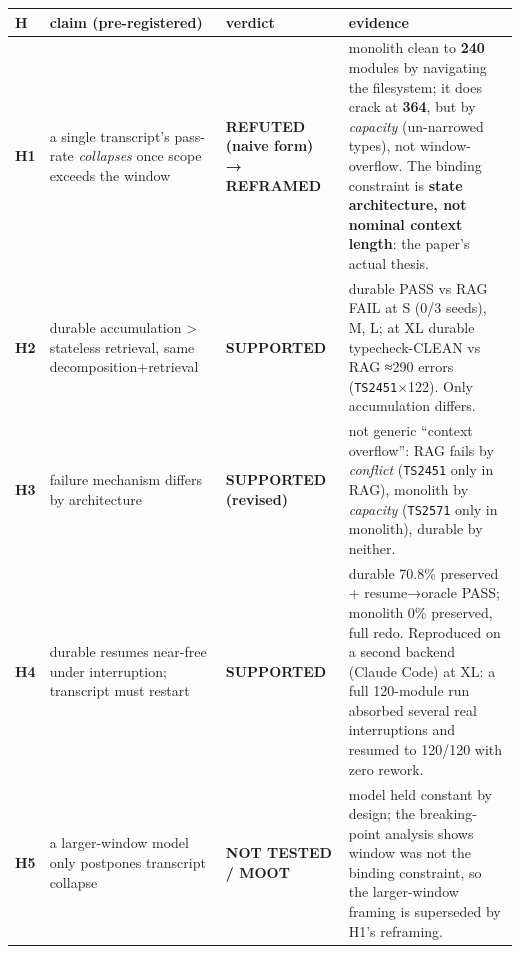 \documentclass[
  10pt,
]{article}
\newcounter{none} %
\begin{document}
{\def\LTcaptype{none} %
\begin{longtable}[]{@{}
  >{\raggedright\arraybackslash}p{}
  >{\raggedright\arraybackslash}p{}
  >{\raggedright\arraybackslash}p{}
  >{\raggedright\arraybackslash}p{}@{}}
\toprule\noalign{}
\begin{minipage}[b]{\linewidth}\raggedright
H
\end{minipage} & \begin{minipage}[b]{\linewidth}\raggedright
claim (pre-registered)
\end{minipage} & \begin{minipage}[b]{\linewidth}\raggedright
verdict
\end{minipage} & \begin{minipage}[b]{\linewidth}\raggedright
evidence
\end{minipage} \\
\midrule\noalign{}
\endhead
\bottomrule\noalign{}
\endlastfoot
\textbf{H1} & a single transcript's pass-rate \emph{collapses} once
scope exceeds the window & \textbf{REFUTED (naive form) → REFRAMED} &
monolith clean to \textbf{240} modules by navigating the filesystem; it
does crack at \textbf{364}, but by \emph{capacity} (un-narrowed types),
not window-overflow. The binding constraint is \textbf{state
architecture, not nominal context length}: the paper's actual thesis. \\
\textbf{H2} & durable accumulation \textgreater{} stateless retrieval,
same decomposition+retrieval & \textbf{SUPPORTED} & durable PASS vs RAG
FAIL at S (0/3 seeds), M, L; at XL durable typecheck-CLEAN vs RAG ≈290
errors (\texttt{TS2451}×122). Only accumulation differs. \\
\textbf{H3} & failure mechanism differs by architecture &
\textbf{SUPPORTED (revised)} & not generic ``context overflow'': RAG
fails by \emph{conflict} (\texttt{TS2451} only in RAG), monolith by
\emph{capacity} (\texttt{TS2571} only in monolith), durable by
neither. \\
\textbf{H4} & durable resumes near-free under interruption; transcript
must restart & \textbf{SUPPORTED} & durable 70.8\% preserved +
resume→oracle PASS; monolith 0\% preserved, full redo. Reproduced on a
second backend (Claude Code) at XL: a full 120-module run absorbed
several real interruptions and resumed to 120/120 with zero rework. \\
\textbf{H5} & a larger-window model only postpones transcript collapse &
\textbf{NOT TESTED / MOOT} & model held constant by design; the
breaking-point analysis shows window was not the binding constraint, so
the larger-window framing is superseded by H1's reframing. \\
\end{longtable}
}
\end{document}
